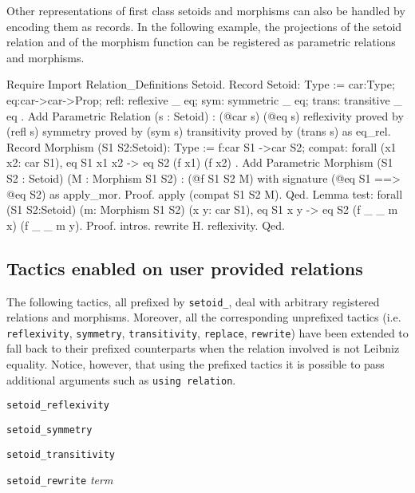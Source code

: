 Other representations of first class setoids and morphisms can also
be handled by encoding them as records. In the following example,
the projections of the setoid relation and of the morphism function 
can be registered as parametric relations and morphisms.
\begin{cscexample}

\begin{coq_example*}
Require Import Relation_Definitions Setoid.
Record Setoid: Type :=
{ car:Type;
  eq:car->car->Prop;
  refl: reflexive _ eq;
  sym: symmetric _ eq;
  trans: transitive _ eq
}.
Add Parametric Relation (s : Setoid) : (@car s) (@eq s)
 reflexivity proved by (refl s)
 symmetry proved by (sym s)
 transitivity proved by (trans s) as eq_rel.
Record Morphism (S1 S2:Setoid): Type :=
{ f:car S1 ->car S2;
  compat: forall (x1 x2: car S1), eq S1 x1 x2 -> eq S2 (f x1) (f x2) }.
Add Parametric Morphism (S1 S2 : Setoid) (M : Morphism S1 S2) :
 (@f S1 S2 M) with signature (@eq S1 ==> @eq S2) as apply_mor.
Proof. apply (compat S1 S2 M). Qed.
Lemma test: forall (S1 S2:Setoid) (m: Morphism S1 S2)
 (x y: car S1), eq S1 x y -> eq S2 (f _ _ m x) (f _ _ m y).
Proof. intros. rewrite H. reflexivity. Qed.
\end{coq_example*}
\end{cscexample}

\subsection{Tactics enabled on user provided relations}
\label{setoidtactics}
The following tactics, all prefixed by \texttt{setoid\_}, 
deal with arbitrary
registered relations and morphisms. Moreover, all the corresponding unprefixed
tactics (i.e. \texttt{reflexivity}, \texttt{symmetry}, \texttt{transitivity},
\texttt{replace}, \texttt{rewrite})
have been extended to fall back to their prefixed counterparts when
the relation involved is not Leibniz equality. Notice, however, that using
the prefixed tactics it is possible to pass additional arguments such as
\texttt{using relation}.
\medskip

\texttt{setoid\_reflexivity}

\texttt{setoid\_symmetry} 

\texttt{setoid\_transitivity}

\texttt{setoid\_rewrite}  \textit{term}
~ ~

